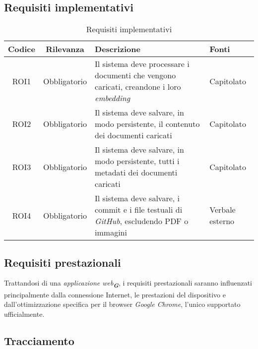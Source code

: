 \subsection{Requisiti implementativi}
\label{sec:Requisiti_implementativi}
\begin{table}[h!]
    \centering
    \renewcommand{\arraystretch}{1.6} %
    \begin{tabularx}{\textwidth}{|>{\centering\arraybackslash}c|>{\centering\arraybackslash}c|>{\centering\arraybackslash}X|>{\centering\arraybackslash}p{3cm}|} \hline
    \rowcolor[HTML]{FFD700} 
    \textbf{Codice} & \textbf{Rilevanza} & \textbf{Descrizione} & \textbf{Fonti} \\ \hline
    ROI1 & Obbligatorio & Il sistema deve processare i documenti che vengono caricati, creandone i loro \emph{embedding} & Capitolato\\ \hline
    ROI2 & Obbligatorio & Il sistema deve salvare, in modo persistente, il contenuto dei documenti caricati & Capitolato \\ \hline
    ROI3 & Obbligatorio & Il sistema deve salvare, in modo persistente, tutti i metadati dei documenti caricati & Capitolato\\ \hline
    ROI4 & Obbligatorio & Il sistema deve salvare, i commit e i file testuali di \emph{GitHub}, escludendo PDF o immagini & Verbale esterno\\ \hline
    \end{tabularx}
    \caption{Requisiti implementativi}
    \label{tab:Requisiti_implementativi}
\end{table}

\subsection{Requisiti prestazionali}
\label{sec:req_prestazionali}
Trattandosi di una \emph{applicazione web}\textsubscript{\textit{\textbf{G}}}, i requisiti prestazionali saranno influenzati principalmente dalla connessione Internet, 
le prestazioni del dispositivo e dall'ottimizzazione specifica per il browser \emph{Google Chrome}, l'unico supportato ufficialmente.

\newpage
\subsection{Tracciamento}

